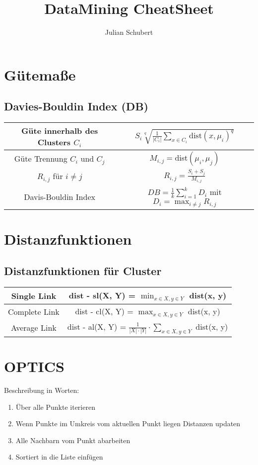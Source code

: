 \documentclass{article}
\title{DataMining CheatSheet}
\author{Julian Schubert}
\begin{document}
\maketitle

\section{Gütemaße}
\subsection{Davies-Bouldin Index (DB)}
    \begin{tabular}{| c | c |}
        \hline
        Güte innerhalb des Clusters $C_i$ 
            & $S_i \sqrt[q]{\frac{1}{|C_i|} \sum_{x \in C_i}\text{dist}(x, \mu_i)^q}$ \\
        \hline
        Güte Trennung $C_i$ und $C_j$
            & $M_{i,j} = $dist$(\mu_i, \mu_j)$ \\
        \hline
        $R_{i,j}$ für $i \neq j$
            & $R_{i, j} = \frac{S_i + S_j}{M_{i, j}}$ \\
        \hline
        Davis-Bouldin Index
            & $DB = \frac{1}{k} \sum_{i = 1}^k D_i$ mit $D_i = \max_{i \neq j} R_{i,j}$ \\
        \hline
    \end{tabular}
\section{Distanzfunktionen}
\subsection{Distanzfunktionen für Cluster}
    \begin{tabular}{| c | c |}
        \hline
        Single Link 
            & dist - sl(X, Y) = $\min_{x \in X, y \in Y}$ dist(x, y) \\
        \hline
        Complete Link
            & dist - cl(X, Y) = $\max_{x \in X, y \in Y}$ dist(x, y) \\
        \hline
        Average Link
            & dist - al(X, Y) = $\frac{1}{|X| \cdot |Y|} \cdot \sum_{x \in X, y\in Y}$ dist(x, y) \\
        \hline
    \end{tabular}

\section{OPTICS}
Beschreibung in Worten: 
\begin{enumerate}
    \item Über alle Punkte iterieren
    \item Wenn Punkte im Umkreis vom aktuellen Punkt liegen Distanzen updaten
    \item Alle Nachbarn vom Punkt abarbeiten
    \item Sortiert in die Liste einfügen
\end{enumerate}
\end{document}

